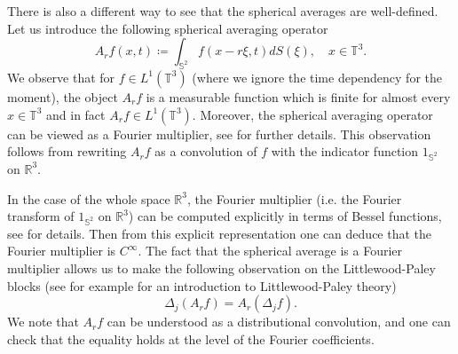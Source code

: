 \documentclass[12pt,a4paper]{article}
\theoremstyle{definition}
\theoremstyle{remark}
\numberwithin{equation}{section}
\begin{document}
There is also a different way to see that the spherical averages are well-defined. Let us introduce the following spherical averaging operator
\begin{equation}
A_r f (x,t) \coloneqq \int_{\mathbb{S}^2} f (x - r \xi, t ) d S (\xi), \quad x \in \mathbb{T}^3.
\end{equation}
We observe that for $f \in L^1 (\mathbb{T}^3)$ (where we ignore the time dependency for the moment), the object $A_r f$ is a measurable function which is finite for almost every $x \in \mathbb{T}^3$ and in fact $A_r f \in L^1 (\mathbb{T}^3)$. Moreover, the spherical averaging operator can be viewed as a Fourier multiplier, see \cite[~Section 6.5]{grafakos} for further details. This observation follows from rewriting $A_r f$ as a convolution of $f$ with the indicator function $1_{\mathbb{S}^2}$ on $\mathbb{R}^3$.


In the case of the whole space $\mathbb{R}^3$, the Fourier multiplier (i.e. the Fourier transform of $1_{\mathbb{S}^2}$ on $\mathbb{R}^3$) can be computed explicitly in terms of Bessel functions, see \cite[~Appendix B.4]{grafakos} for details. Then from this explicit representation one can deduce that the Fourier multiplier is $C^\infty$.
The fact that the spherical average is a Fourier multiplier allows us to make the following observation on the Littlewood-Paley blocks (see for example \cite{boutrosnonuniqueness,bahouri} for an introduction to Littlewood-Paley theory)
\begin{equation} \label{convolutionequality}
\Delta_j (A_r f) = A_r (\Delta_j f).
\end{equation}
We note that $A_r f$ can be understood as a distributional convolution, and one can check that the equality holds at the level of the Fourier coefficients.
\end{document}
